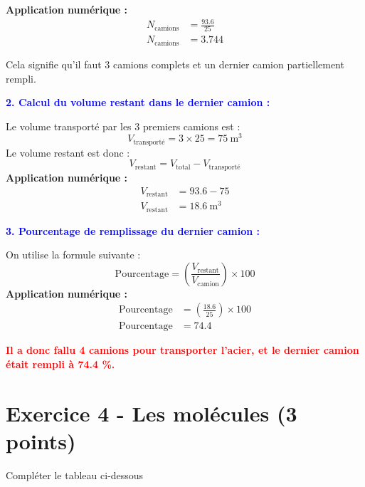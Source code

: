 \documentclass[answers]{exam}
\begin{document}
\begin{questions}
\begin{solution}
      \textbf{Application numérique :}
      \begin{align*}
        N_{\text{camions}} &= \frac{93.6}{25} \\
        N_{\text{camions}} &= 3.744
      \end{align*}
  
      Cela signifie qu'il faut \( 3 \) camions complets et un dernier camion partiellement rempli.  
      \vspace{1em}
  
      \textcolor{blue}{\textbf{2. Calcul du volume restant dans le dernier camion :}}  
  
      Le volume transporté par les 3 premiers camions est :  
      \[
      V_{\text{transporté}} = 3 \times 25 = 75 \ \text{m}^3
      \]
      Le volume restant est donc :  
      \[
      V_{\text{restant}} = V_{\text{total}} - V_{\text{transporté}}
      \]
      \textbf{Application numérique :}
      \begin{align*}
        V_{\text{restant}} &= 93.6 - 75 \\
        V_{\text{restant}} &= 18.6 \ \text{m}^3
      \end{align*}
  
      \textcolor{blue}{\textbf{3. Pourcentage de remplissage du dernier camion :}}
  
      On utilise la formule suivante :  
      \[
      \text{Pourcentage} = \left( \frac{V_{\text{restant}}}{V_{\text{camion}}} \right) \times 100
      \]
      \textbf{Application numérique :}
      \begin{align*}
        \text{Pourcentage} &= \left( \frac{18.6}{25} \right) \times 100 \\
        \text{Pourcentage} &= 74.4
      \end{align*}
  
      \textcolor{red}{\textbf{Il a donc fallu 4 camions pour transporter l'acier, et le dernier camion était rempli à 74.4 \%.}}
    \end{solution}
  
  \end{questions}
  
\section*{Exercice 4 - Les molécules (3 points)}

\begin{questions}
  \question[3] Compléter le tableau ci-dessous
  \end{questions}
\end{document}
